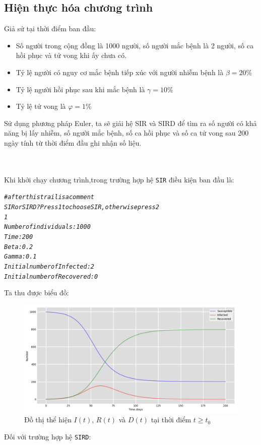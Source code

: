\documentclass[a4paper]{article}
\begin{document}
\subsection{Hiện thực hóa chương trình}
Giả sử tại thời điểm ban đầu:
\begin{itemize}
    \item Số người trong cộng đồng là 1000 người, số người mắc bệnh là 2  người, số ca hồi phục và tử vong khi ấy chưa có.
    \item Tỷ lệ người có nguy cơ mắc bệnh tiếp xúc với người nhiễm bệnh là  $\beta = 20\%$
    \item Tỷ lệ người hồi phục sau khi mắc bệnh là  $\gamma = 10\%$
    \item Tỷ lệ tử vong là  $\varphi = 1\%$
    
\end{itemize}
Sử dụng phương pháp Euler, ta sẽ giải hệ SIR và SIRD để tìm ra số người có khả năng bị lấy nhiễm, số người mắc bệnh, số ca hồi phục và số ca tử vong sau 200 ngày tính từ thời điểm đầu ghi nhận số liệu.

\\\\
Khi khởi chạy chương trình,trong trường hợp hệ {\tt SIR} điều kiện ban đầu là:


\begin{mdframed}[hidealllines=true,backgroundcolor=blue!10]
\begin{alltt}
\textit{
# after this trail is a comment
SIR or SIRD? Press 1 to choose SIR, otherwise press 2
1
Number of individuals: 1000
Time: 200  
Beta: 0.2 
Gamma: 0.1
Initial number of Infected: 2
Initial number of Recovered: 0
}
\end{alltt}
\end{mdframed}

Ta thu được biểu đồ:

\begin{figure}[!ht]\caption{Đồ thị thể hiện  ${I(t)}$, ${R(t)}$ và ${D(t)}$ tại thời điểm ${t  \geq  t_{0}}$ } \label{Fig:Frequency}
	\begin{center}
	\includegraphics[scale=0.5]{Images/Frequency.png}
	\end{center}
\end{figure}
\break 
Đối với trường hợp hệ {\tt SIRD}:
\end{document}
